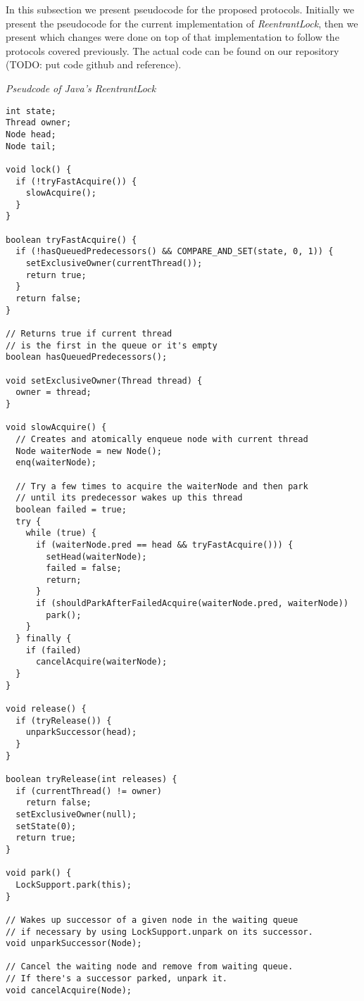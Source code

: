 In this subsection we present pseudocode for the proposed protocols. Initially we present the pseudocode for the current implementation of \emph{ReentrantLock}, then we present which changes were done on top of that implementation to follow the protocols covered previously. The actual code can be found on our repository (TODO: put code github and reference).

\medskip

\noindent
{\it Pseudcode of Java's ReentrantLock}
\begin{verbatim}
int state;
Thread owner;
Node head;
Node tail;

void lock() {
  if (!tryFastAcquire()) {
    slowAcquire();
  }
}

boolean tryFastAcquire() {
  if (!hasQueuedPredecessors() && COMPARE_AND_SET(state, 0, 1)) {
    setExclusiveOwner(currentThread());
    return true;
  }
  return false;	
}

// Returns true if current thread
// is the first in the queue or it's empty
boolean hasQueuedPredecessors();

void setExclusiveOwner(Thread thread) {
  owner = thread;
}

void slowAcquire() {
  // Creates and atomically enqueue node with current thread
  Node waiterNode = new Node();
  enq(waiterNode);

  // Try a few times to acquire the waiterNode and then park
  // until its predecessor wakes up this thread
  boolean failed = true;
  try {
    while (true) {
      if (waiterNode.pred == head && tryFastAcquire())) {
        setHead(waiterNode);
        failed = false;
        return;
      }
      if (shouldParkAfterFailedAcquire(waiterNode.pred, waiterNode))
        park();
    }
  } finally {
    if (failed)
      cancelAcquire(waiterNode);
  }
}

void release() {
  if (tryRelease()) {
    unparkSuccessor(head);
  }
}

boolean tryRelease(int releases) {
  if (currentThread() != owner)
    return false;
  setExclusiveOwner(null);
  setState(0);
  return true;
}

void park() {
  LockSupport.park(this);
}

// Wakes up successor of a given node in the waiting queue
// if necessary by using LockSupport.unpark on its successor.
void unparkSuccessor(Node);

// Cancel the waiting node and remove from waiting queue.
// If there's a successor parked, unpark it.
void cancelAcquire(Node);


\end{verbatim}
